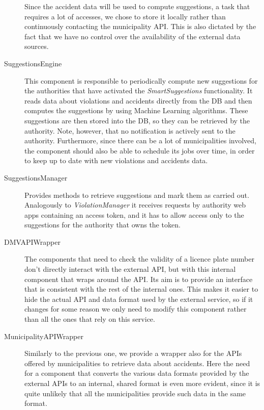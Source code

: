 \begin{description}
    Since the accident data will be used to compute suggestions, a task that
    requires a lot of accesses, we chose to store it locally rather than
    continuously contacting the municipality API. This is also dictated by
    the fact that we have no control over the availability of the external
    data sources.
    \item[SuggestionsEngine] This component is responsible to periodically
    compute new suggestions for the authorities that have activated the
    \emph{SmartSuggestions} functionality.
    It reads data about violations and accidents directly from the DB and
    then computes the suggestions by using Machine Learning algorithms.
    These suggestions are then stored into the DB, so they can be retrieved
    by the authority. Note, however, that no notification is actively sent to
    the authority.
    Furthermore, since there can be a lot of municipalities involved, the
    component should also be able to schedule its jobs over time, in order to
    keep up to date with new violations and accidents data.
    \item[SuggestionsManager] Provides methods to retrieve suggestions and
    mark them as carried out. Analogously to \emph{ViolationManager} it receives
    requests by authority web apps containing an access token, and it has to
    allow access only to the suggestions for the authority that owns the token.
    \item[DMVAPIWrapper] The components that need to check the validity of
    a licence plate number don't directly interact with the external API, but
    with this internal component that wraps around the API.
    Its aim is to provide an interface that is consistent with the rest of the
    internal ones. This makes it easier to hide the actual API and data format
    used by the external service, so if it changes for some reason we only
    need to modify this component rather than all the ones that rely on this
    service.
    \item[MunicipalityAPIWrapper] Similarly to the previous one, we provide a
    wrapper also for the APIs offered by municipalities to retrieve data about
    accidents. Here the need for a component that converts the various data
    formats provided by the external APIs to an internal, shared format is
    even more evident, since it is quite unlikely that all the municipalities
    provide such data in the same format.
\end{description}